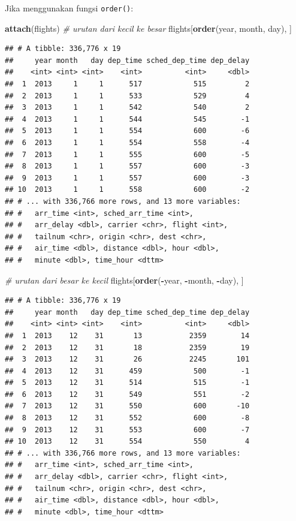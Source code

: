 \documentclass[]{book}
\newenvironment{Shaded}{\begin{snugshade}}{\end{snugshade}}
\newcommand{\KeywordTok}[1]{\textcolor[rgb]{0.13,0.29,0.53}{\textbf{#1}}}
\newcommand{\CommentTok}[1]{\textcolor[rgb]{0.56,0.35,0.01}{\textit{#1}}}
\newcommand{\OperatorTok}[1]{\textcolor[rgb]{0.81,0.36,0.00}{\textbf{#1}}}
\newcommand{\NormalTok}[1]{#1}
\begin{document}
Jika menggunakan fungsi \texttt{order()}:

\begin{Shaded}
\begin{Highlighting}[]
\KeywordTok{attach}\NormalTok{(flights)}
\CommentTok{# urutan dari kecil ke besar}
\NormalTok{flights[}\KeywordTok{order}\NormalTok{(year, month, day), ]}
\end{Highlighting}
\end{Shaded}

\begin{verbatim}
## # A tibble: 336,776 x 19
##     year month   day dep_time sched_dep_time dep_delay
##    <int> <int> <int>    <int>          <int>     <dbl>
##  1  2013     1     1      517            515         2
##  2  2013     1     1      533            529         4
##  3  2013     1     1      542            540         2
##  4  2013     1     1      544            545        -1
##  5  2013     1     1      554            600        -6
##  6  2013     1     1      554            558        -4
##  7  2013     1     1      555            600        -5
##  8  2013     1     1      557            600        -3
##  9  2013     1     1      557            600        -3
## 10  2013     1     1      558            600        -2
## # ... with 336,766 more rows, and 13 more variables:
## #   arr_time <int>, sched_arr_time <int>,
## #   arr_delay <dbl>, carrier <chr>, flight <int>,
## #   tailnum <chr>, origin <chr>, dest <chr>,
## #   air_time <dbl>, distance <dbl>, hour <dbl>,
## #   minute <dbl>, time_hour <dttm>
\end{verbatim}

\begin{Shaded}
\begin{Highlighting}[]
\CommentTok{# urutan dari besar ke kecil}
\NormalTok{flights[}\KeywordTok{order}\NormalTok{(}\OperatorTok{-}\NormalTok{year, }\OperatorTok{-}\NormalTok{month, }\OperatorTok{-}\NormalTok{day), ]}
\end{Highlighting}
\end{Shaded}

\begin{verbatim}
## # A tibble: 336,776 x 19
##     year month   day dep_time sched_dep_time dep_delay
##    <int> <int> <int>    <int>          <int>     <dbl>
##  1  2013    12    31       13           2359        14
##  2  2013    12    31       18           2359        19
##  3  2013    12    31       26           2245       101
##  4  2013    12    31      459            500        -1
##  5  2013    12    31      514            515        -1
##  6  2013    12    31      549            551        -2
##  7  2013    12    31      550            600       -10
##  8  2013    12    31      552            600        -8
##  9  2013    12    31      553            600        -7
## 10  2013    12    31      554            550         4
## # ... with 336,766 more rows, and 13 more variables:
## #   arr_time <int>, sched_arr_time <int>,
## #   arr_delay <dbl>, carrier <chr>, flight <int>,
## #   tailnum <chr>, origin <chr>, dest <chr>,
## #   air_time <dbl>, distance <dbl>, hour <dbl>,
## #   minute <dbl>, time_hour <dttm>
\end{verbatim}
\end{document}
